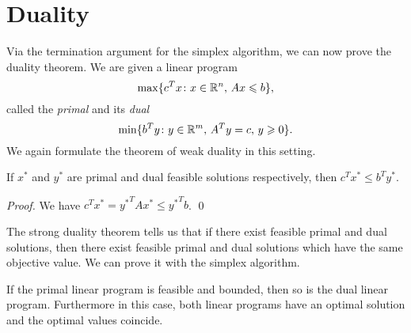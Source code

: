 \chapter{Duality}
\label{cha:duality}





Via the termination argument for the simplex algorithm, we can now
prove the duality theorem. We are given a linear program
\begin{equation}
  \label{eq:91}
  \max\{c^T x \colon x \in \mathbb{R}^n, \, Ax \leqslant b\}, 
\end{equation}
called the \emph{primal} and its \emph{dual}
\begin{equation}
  \label{d:eq:9}
  \min\{b^Ty \colon y \in \mathbb{R}^m, \, A^T y = c,\, y\geqslant0\}.
\end{equation}
%
We again formulate the theorem of weak duality in this setting. 
\begin{theorem}
  If $x^*$ and $y^*$ are primal and dual feasible solutions respectively, then
  $c^Tx^* \leq b^Ty^*$. 
\end{theorem}

\begin{proof}
  We have $c^Tx^* = {y^*}^T A x^* \leq  {y^*}^T b$. \qed 
\end{proof}

The
strong duality theorem tells us that if there exist feasible primal and
dual solutions, then there exist feasible primal and dual solutions
which have the same objective value. We can prove it with the simplex
algorithm. 


\begin{theorem}
  \label{thr:4}
  If the primal linear program is feasible and bounded, then so is 
  the dual linear program. Furthermore in this case, both linear
  programs have an optimal solution  and the optimal  values coincide. 
\end{theorem}


